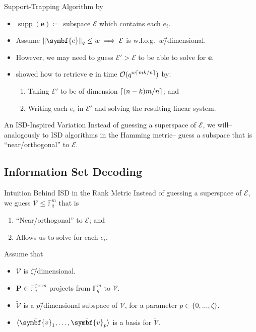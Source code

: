 \documentclass[usepdftitle=false]{beamer}
\renewcommand*{\vec}{\symbf}
\newcommand*{\mat}{\symbf}
\DeclareMathOperator{\supp}{supp}
\DeclarePairedDelimiter{\basis}{\langle}{\rangle}
\newcommand*{\FF}{\ensuremath{\mathbb{F}}}
\newcommand*{\BigOh}{\mathcal{O}}
\DeclarePairedDelimiter{\ceil}{\lceil}{\rceil}
\DeclarePairedDelimiter{\norm}{\lVert}{\rVert}
\newcommand*{\normR}[2]{\ensuremath{\norm{#1}_{#2}}}
\begin{document}
\begin{frame}{Support-Trapping Algorithm by \citeauthor{GRS13}}
  \begin{itemize}
  \item \(\supp(\vec{e}) \coloneqq\) subspace \(\mathcal{E}\) which
    contains each \(e_i\).
  \item Assume \(\normR{\vec{e}}{q} \le w \implies \mathcal{E}\) is
    w.l.o.g.\ \(w\)\=/dimensional.
  \item However, we may need to guess \(\mathcal{E}' > \mathcal{E}\)
    to be able to solve for \(\vec{e}\).
  \item {} showed how to retrieve \(\vec{e}\) in time
    \(\BigOh(q^{w \ceil{m k / {n}}})\) by:
    \begin{enumerate}
    \item Taking \(\mathcal{E}'\) to be of dimension
      \(\ceil{(n - k) m / {n}}\); and
    \item Writing each \(e_i\) in \(\mathcal{E}'\) and solving the
      resulting linear system.
    \end{enumerate}
  \end{itemize}
  \begin{alertblock}{An ISD-Inspired Variation}
    Instead of guessing a superspace of \(\mathcal{E}\), we will\---
    analogously to ISD algorithms in the Hamming metric\--- guess a
    subspace that is \enquote{near\-/orthogonal} to \(\mathcal{E}\).
  \end{alertblock}
\end{frame}

\subsection{Information Set Decoding}

\begin{frame}{Intuition Behind ISD in the Rank Metric}
  Instead of guessing a superspace of \(\mathcal{E}\), we guess
  \(\mathcal{V} \le \FF_q^m\) that is
  \begin{enumerate}
  \item \enquote{Near\-/orthogonal} to \(\mathcal{E}\); and
  \item Allows us to solve for each \(e_i\).
  \end{enumerate}
  Assume that
  \begin{itemize}
  \item \(\mathcal{V}\) is \(\zeta\)\=/dimensional.
  \item \(\mat{P} \in \FF_q^{\zeta \times m}\) projects from
    \(\FF_q^m\) to \(\mathcal{V}\).
  \item \(\tilde{\mathcal{V}}\) is a \(p\)\=/dimensional subspace of
    \(\mathcal{V}\), for a parameter \(p \in \{0, \ldots, \zeta\}\).
  \item \(\basis{\tilde{\vec{v}}_1, \ldots, \tilde{\vec{v}}_p}\) is a
    basis for \(\tilde{\mathcal{V}}\).
  \end{itemize}
\end{frame}
\end{document}
